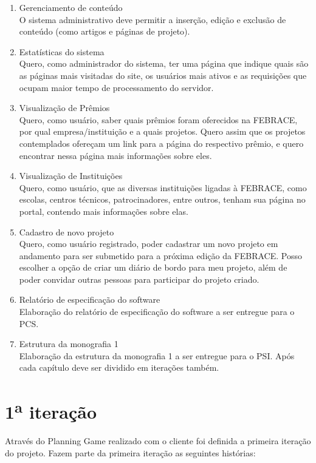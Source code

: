 \documentclass[a4paper,12pt,font=plain,header=plain]{abnt}
\begin{document}
\begin{enumerate}
	 \item Gerenciamento de conteúdo \\
		O sistema administrativo deve permitir a inserção, edição e exclusão de conteúdo (como artigos e páginas de projeto).
	 \item Estatísticas do sistema \\
		Quero, como administrador do sistema, ter uma página que indique quais são as páginas mais visitadas do site, os usuários mais ativos e as requisições que ocupam maior tempo de processamento do servidor.
	 \item Visualização de Prêmios \\
		Quero, como usuário, saber quais prêmios foram oferecidos na FEBRACE, por qual empresa/instituição e a quais projetos. Quero assim que os projetos contemplados ofereçam um link para a página do respectivo prêmio, e quero encontrar nessa página mais informações sobre eles.
	 \item Visualização de Instituições \\
		Quero, como usuário, que as diversas instituições ligadas à FEBRACE, como escolas, centros técnicos, patrocinadores, entre outros, tenham sua página no portal, contendo mais informações sobre elas.
	 \item Cadastro de novo projeto \\
		Quero, como usuário registrado, poder cadastrar um novo projeto em andamento para ser submetido para a próxima edição da FEBRACE. Posso escolher a opção de criar um diário de bordo para meu projeto, além de poder convidar outras pessoas para participar do projeto criado.
	 \item Relatório de especificação do software \\
		Elaboração do relatório de especificação do software a ser entregue para o PCS.
	 \item Estrutura da monografia 1 \\
		Elaboração da estrutura da monografia 1 a ser entregue para o PSI. Após cada capítulo deve ser dividido em iterações também.
	\end{enumerate}

  \section{1\textsuperscript{a} iteração}

	Através do Planning Game realizado com o cliente foi definida a primeira iteração do projeto. Fazem parte da primeira iteração as seguintes histórias:
\end{document}

